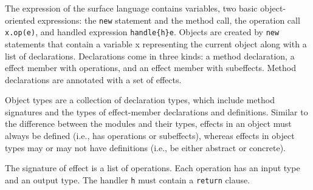 \documentclass{article}
\theoremstyle{definition}
\begin{document}
The expression of the surface language contains variables, two basic object-oriented expressions: the \texttt{new} statement and the method call, the operation call \texttt{x.op(e)}, and handled expression \texttt{handle\{h\}e}. Objects are created by \texttt{new} statements that contain a variable x representing the current object along with a list of declarations.  Declarations come in three kinds: a method declaration, a effect member with operations, and an effect member with subeffects. Method declarations are annotated with a set of effects.  

Object types are a collection of declaration types, which include method signatures and the types of effect-member declarations and definitions. Similar to the difference between the modules and their types, effects in an object must always be defined (i.e., has operations or subeffects), whereas effects in object types may or may not have definitions (i.e., be either abstract or concrete).

The signature of effect is a list of operations. Each operation has an input type and an output type. The handler \texttt{h} must contain a \texttt{return} clause. 
\end{document}
